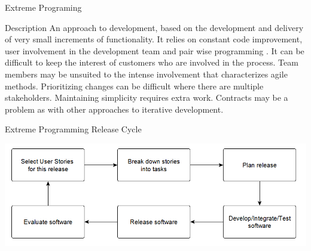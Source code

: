 \documentclass[final,hyperref={pdfpagelabels=false}]{beamer}
\begin{document}
  \begin{frame}{Extreme Programing}
     \begin{block}{\large Description}
        \centering
        An approach to development, based on the development
        and delivery of very small increments of functionality. It
        relies on constant code improvement, user involvement in
        the development team and pair wise programming . It can
        be difficult to keep the interest of customers who are
        involved in the process. Team members may be unsuited
        to the intense involvement that characterizes agile
        methods. Prioritizing changes can be difficult where there
        are multiple stakeholders. Maintaining simplicity requires
        extra work. Contracts may be a problem as with other
        approaches to iterative development.
    \end{block}
    \vfill
    \begin{block}{\large  Extreme Programming Release Cycle}
      \centering
      
        \includegraphics[width=.5\linewidth]{XP}
       

\end{block}
\end{frame}
\end{document}
